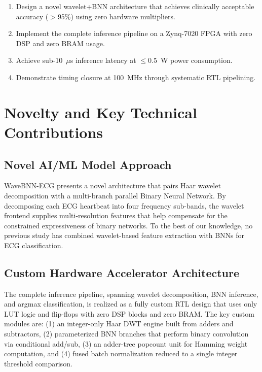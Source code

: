 \documentclass[conference]{IEEEtran}
\begin{document}
\begin{enumerate}
    \item Design a novel wavelet+BNN architecture that achieves clinically acceptable accuracy ($>$95\%) using zero hardware multipliers.
    \item Implement the complete inference pipeline on a Zynq-7020 FPGA with zero DSP and zero BRAM usage.
    \item Achieve sub-10~$\mu$s inference latency at $\leq$0.5~W power consumption.
    \item Demonstrate timing closure at 100~MHz through systematic RTL pipelining.
\end{enumerate}

\section{Novelty and Key Technical Contributions}

\subsection{Novel AI/ML Model Approach}

WaveBNN-ECG presents a novel architecture that pairs Haar wavelet decomposition with a multi-branch parallel Binary Neural Network. By decomposing each ECG heartbeat into four frequency sub-bands, the wavelet frontend supplies multi-resolution features that help compensate for the constrained expressiveness of binary networks. To the best of our knowledge, no previous study has combined wavelet-based feature extraction with BNNs for ECG classification.

\subsection{Custom Hardware Accelerator Architecture}

The complete inference pipeline, spanning wavelet decomposition, BNN inference, and argmax classification, is realized as a fully custom RTL design that uses only LUT logic and flip-flops with zero DSP blocks and zero BRAM. The key custom modules are: (1) an integer-only Haar DWT engine built from adders and subtractors, (2) parameterized BNN branches that perform binary convolution via conditional add/sub, (3) an adder-tree popcount unit for Hamming weight computation, and (4) fused batch normalization reduced to a single integer threshold comparison.
\end{document}
